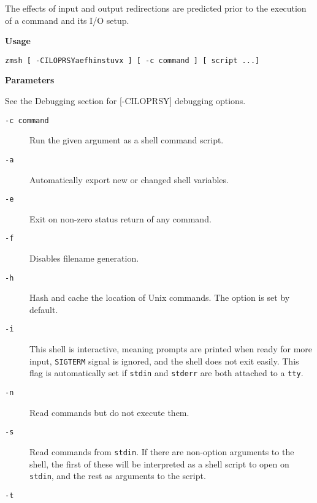 The effects of input and output redirections are predicted 
prior to the execution of a command and its I/O setup.

{\bf Usage}

\begin{verbatim}
zmsh [ -CILOPRSYaefhinstuvx ] [ -c command ] [ script ...] 
\end{verbatim}


{\bf Parameters}

See the Debugging section for [-CILOPRSY] 
debugging options. 

\begin{description}
\item[{\tt -c command}] \mbox{}

Run the given argument as a shell 
command script. 

\item[{\tt -a}] \mbox{}

Automatically export new or changed shell 
variables.  

\item[{\tt -e}] \mbox{}

Exit on non-zero status return of any command. 

\item[{\tt -f}] \mbox{}

Disables filename generation. 

\item[{\tt -h}] \mbox{}

Hash and cache the location of Unix commands. 
The option is set by default. 

\item[{\tt -i}] \mbox{}

This shell is interactive, meaning prompts 
are printed when ready for more input, {\tt SIGTERM} signal 
is ignored, and the shell does not exit easily. This flag is 
automatically set if {\tt stdin} and {\tt stderr} are 
both attached to a {\tt tty}. 

\item[{\tt -n}] \mbox{}

Read commands but do not execute them. 

\item[{\tt -s}] \mbox{}

Read commands from {\tt stdin}. If there 
are non-option arguments to the shell, the first of these will 
be interpreted as a shell script to open on {\tt stdin}, 
and the rest as arguments to the script. 

\item[{\tt -t}] \mbox{}


\end{description}
